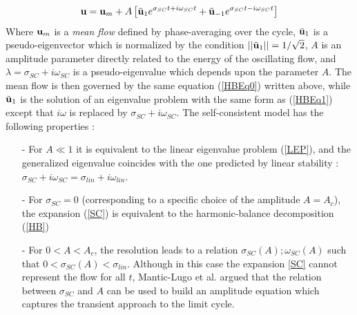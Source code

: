 \documentclass[twocolumn,10pt]{asme2ej}
\newcommand{\be}[1]{ \begin{equation} \label{#1}}
\newcommand{\ee}{\end{equation}}
\begin{document}
\be{SC}
{\bf u } = {\bf u }_m + A \left[ \tilde{{\bf u }}_1 e^{\sigma_{SC} t + i \omega_{SC} t} +   \tilde{\bf u }_{-1} e^{\sigma_{SC} t  -i \omega_{SC} t} \right]
\ee  
Where ${\bf u }_m$ is a {\em mean flow} defined by phase-averaging over the cycle, $\tilde{{\bf u }}_1$ is a pseudo-eigenvector which is normalized by the condition  $||\tilde{{\bf u }}_1|| = 1/\sqrt{2}$, 
 $A$ is an amplitude parameter directly related to the energy of the oscillating flow, and $\lambda = \sigma_{SC} + i \omega_{SC}$ is a pseudo-eigenvalue which depends upon the parameter $A$. The mean flow is then governed by the same equation
(\ref{HBEq0}) written above, while $\tilde{{\bf u }}_1$ is the solution of an eigenvalue problem with the same form as  (\ref{HBEq1}) except that $i \omega$ is replaced by $\sigma_{SC} + i \omega_{SC}$.
The self-consistent model has the following properties :
\begin{itemize}
\item[-] For $A \ll 1$ it is equivalent to the linear eigenvalue problem (\ref{LEP}), and the generalized eigenvalue coincides with the one predicted by linear stability : $\sigma_{SC} + i \omega_{SC} = \sigma_{lin} + i \omega_{lin}$. 
\item[-] For $\sigma_{SC}=0$ (corresponding to a specific choice of the amplitude $A=A_c$),  the expansion (\ref{SC}) is equivalent to the harmonic-balance decomposition (\ref{HB})
\item[-] For $0<A<A_c$, the resolution leads to a relation $\sigma_{SC}(A) ; \omega_{SC}(A)$
such that $0< \sigma_{SC}(A) < \sigma_{lin}$.
 Although in this case the expansion \ref{SC} cannot represent the flow for all $t$, Mantic-Lugo et al. argued that the relation between $\sigma_{SC}$ and $A$ can be used to build an amplitude equation which captures the transient approach to the limit cycle. 
\end{itemize}




\end{document}

